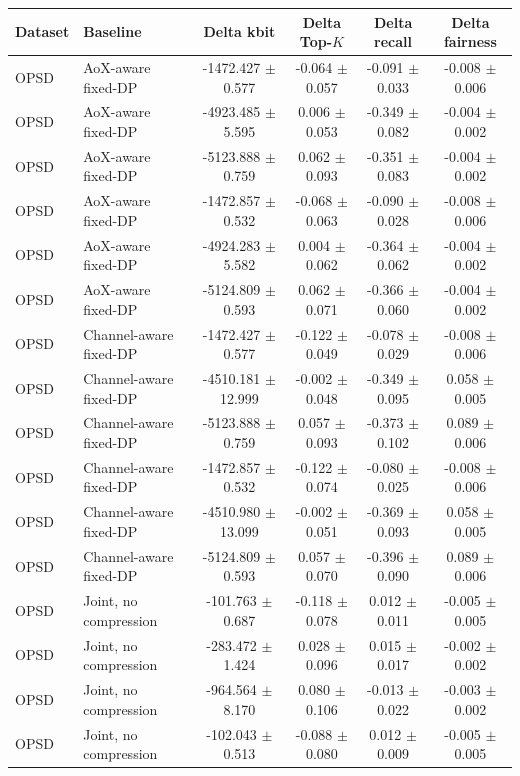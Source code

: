 \begin{tabular}{llcccc}
\toprule
Dataset & Baseline & Delta kbit & Delta Top-$K$ & Delta recall & Delta fairness \\
\midrule
OPSD & AoX-aware fixed-DP & -1472.427 $\pm$ 0.577 & -0.064 $\pm$ 0.057 & -0.091 $\pm$ 0.033 & -0.008 $\pm$ 0.006 \\
OPSD & AoX-aware fixed-DP & -4923.485 $\pm$ 5.595 & 0.006 $\pm$ 0.053 & -0.349 $\pm$ 0.082 & -0.004 $\pm$ 0.002 \\
OPSD & AoX-aware fixed-DP & -5123.888 $\pm$ 0.759 & 0.062 $\pm$ 0.093 & -0.351 $\pm$ 0.083 & -0.004 $\pm$ 0.002 \\
OPSD & AoX-aware fixed-DP & -1472.857 $\pm$ 0.532 & -0.068 $\pm$ 0.063 & -0.090 $\pm$ 0.028 & -0.008 $\pm$ 0.006 \\
OPSD & AoX-aware fixed-DP & -4924.283 $\pm$ 5.582 & 0.004 $\pm$ 0.062 & -0.364 $\pm$ 0.062 & -0.004 $\pm$ 0.002 \\
OPSD & AoX-aware fixed-DP & -5124.809 $\pm$ 0.593 & 0.062 $\pm$ 0.071 & -0.366 $\pm$ 0.060 & -0.004 $\pm$ 0.002 \\
OPSD & Channel-aware fixed-DP & -1472.427 $\pm$ 0.577 & -0.122 $\pm$ 0.049 & -0.078 $\pm$ 0.029 & -0.008 $\pm$ 0.006 \\
OPSD & Channel-aware fixed-DP & -4510.181 $\pm$ 12.999 & -0.002 $\pm$ 0.048 & -0.349 $\pm$ 0.095 & 0.058 $\pm$ 0.005 \\
OPSD & Channel-aware fixed-DP & -5123.888 $\pm$ 0.759 & 0.057 $\pm$ 0.093 & -0.373 $\pm$ 0.102 & 0.089 $\pm$ 0.006 \\
OPSD & Channel-aware fixed-DP & -1472.857 $\pm$ 0.532 & -0.122 $\pm$ 0.074 & -0.080 $\pm$ 0.025 & -0.008 $\pm$ 0.006 \\
OPSD & Channel-aware fixed-DP & -4510.980 $\pm$ 13.099 & -0.002 $\pm$ 0.051 & -0.369 $\pm$ 0.093 & 0.058 $\pm$ 0.005 \\
OPSD & Channel-aware fixed-DP & -5124.809 $\pm$ 0.593 & 0.057 $\pm$ 0.070 & -0.396 $\pm$ 0.090 & 0.089 $\pm$ 0.006 \\
OPSD & Joint, no compression & -101.763 $\pm$ 0.687 & -0.118 $\pm$ 0.078 & 0.012 $\pm$ 0.011 & -0.005 $\pm$ 0.005 \\
OPSD & Joint, no compression & -283.472 $\pm$ 1.424 & 0.028 $\pm$ 0.096 & 0.015 $\pm$ 0.017 & -0.002 $\pm$ 0.002 \\
OPSD & Joint, no compression & -964.564 $\pm$ 8.170 & 0.080 $\pm$ 0.106 & -0.013 $\pm$ 0.022 & -0.003 $\pm$ 0.002 \\
OPSD & Joint, no compression & -102.043 $\pm$ 0.513 & -0.088 $\pm$ 0.080 & 0.012 $\pm$ 0.009 & -0.005 $\pm$ 0.005 \\

\end{tabular}
